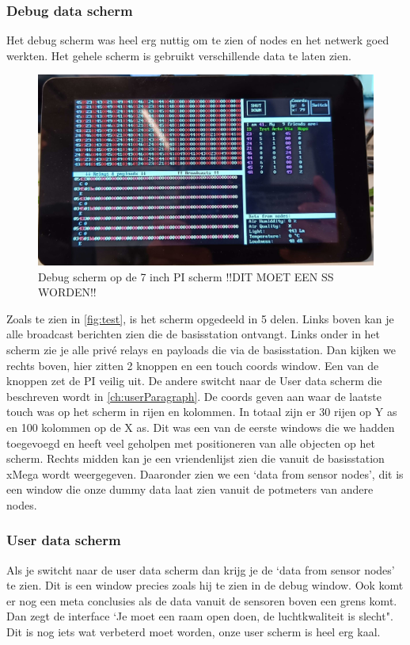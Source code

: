 \subsubsection{Debug data scherm}
Het debug scherm was heel erg nuttig om te zien of nodes en het netwerk goed werkten. 
Het gehele scherm is gebruikt verschillende data te laten zien. 
\begin{figure}[h]
    \centering
    \includegraphics*[scale=0.17]{img/debugScherm.jpg}
    \caption{Debug scherm op de 7 inch PI scherm !!DIT MOET EEN SS WORDEN!!}
    \label{fig:test}
\end{figure}
Zoals te zien in \autoref{fig:test}, is het scherm opgedeeld in 5 delen. Links boven kan je alle broadcast berichten zien die de basisstation ontvangt. 
Links onder in het scherm zie je alle privé relays en payloads die via de basisstation. Dan kijken we rechts boven, hier zitten 2 knoppen en een touch coords window. Een van de knoppen zet de PI veilig uit. De andere switcht naar de User data scherm die beschreven wordt in \autoref{ch:userParagraph}.
De coords geven aan waar de laatste touch was op het scherm in rijen en kolommen. In totaal zijn er 30 rijen op Y as en 100 kolommen op de X as. Dit was een van de eerste windows die we hadden toegevoegd en heeft veel geholpen met positioneren van alle objecten op het scherm.
Rechts midden kan je een vriendenlijst zien die vanuit de basisstation xMega wordt weergegeven. Daaronder zien we een `data from sensor nodes', dit is een window die onze dummy data laat zien vanuit de potmeters van andere nodes. 
\subsubsection{User data scherm}\label{ch:userParagraph}
Als je switcht naar de user data scherm dan krijg je de `data from sensor nodes' te zien. Dit is een window precies zoals hij te zien in de debug window.
Ook komt er nog een meta conclusies als de data vanuit de sensoren boven een grens komt. Dan zegt de interface `Je moet een raam open doen, de luchtkwaliteit is slecht". Dit is nog iets wat verbeterd moet worden, onze user scherm is heel erg kaal. 